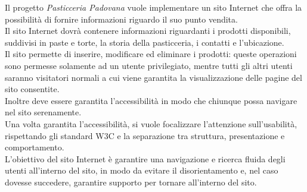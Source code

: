 Il progetto \emph{Pasticceria Padovana} vuole implementare un sito Internet che offra la possibilità di fornire informazioni riguardo il suo punto vendita.\\
Il sito Internet dovrà contenere informazioni riguardanti i prodotti disponibili, suddivisi in paste e torte, la storia della pasticceria, i contatti e l'ubicazione.\\
Il sito permette di inserire, modificare ed eliminare i prodotti: queste operazioni sono permesse solamente ad un utente privilegiato, mentre tutti gli altri utenti saranno visitatori 
normali a cui viene garantita la visualizzazione delle pagine del sito consentite.\\
Inoltre deve essere garantita l'accessibilità in modo che chiunque possa navigare nel sito serenamente.\\
Una volta garantita l'accessibilità, si vuole focalizzare l'attenzione sull'usabilità, rispettando gli standard W3C e la separazione tra struttura, presentazione e comportamento.\\
L'obiettivo del sito Internet è garantire una navigazione e ricerca fluida degli utenti all'interno del sito, in modo da evitare il disorientamento e, nel caso dovesse succedere, 
garantire supporto per tornare all'interno del sito.\\
